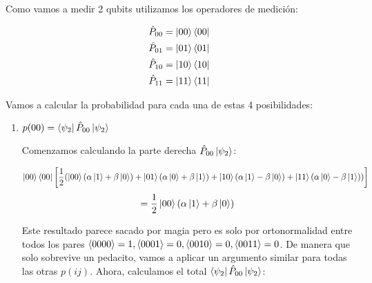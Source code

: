 \begin{itemize}
        Como vamos a medir 2 qubits utilizamos los operadores de medición:

        \begin{align*}
            \hat{P}_{00} = \ket{00}\bra{00} \\
            \hat{P}_{01} = \ket{01}\bra{01} \\
            \hat{P}_{10} = \ket{10}\bra{10} \\
            \hat{P}_{11} = \ket{11}\bra{11} \\
        \end{align*}

        Vamos a calcular la probabilidad para cada una de estas 4 posibilidades: \vspace{.3cm}
        
        \begin{enumerate}[label=\arabic*.]
            \item $p(00) = \bra{\psi_2} \hat{P}_{00} \ket{\psi_2}$ \vspace{.3cm}

            Comenzamos calculando la parte derecha $\hat{P}_{00} \ket{\psi_2}$:

                \begin{align*}
                    \ket{00}\bra{00}\left[\frac{1}{2}(\ket{00}(\alpha\ket{1}+\beta\ket{0})+\ket{01}(\alpha\ket{0}+\beta\ket{1})+\ket{10}(\alpha\ket{1}-\beta\ket{0})+\ket{11}(\alpha\ket{0}-\beta\ket{1}))\right]
                \end{align*}
                \begin{align*}
                    = \frac{1}{2} \ket{00}(\alpha \ket{1}+\beta\ket{0})
                \end{align*}
        

            Este resultado parece sacado por magia pero es solo por ortonormalidad entre todos los
            pares $\braket{0000}=1, \braket{0001}=0, \braket{0010}=0, \braket{0011}=0$. De manera
            que solo sobrevive un pedacito, vamos a aplicar un argumento similar para todas las
            otras $p(ij)$. Ahora, calculamos el total $\bra{\psi_2} \hat{P}_{00}\ket{\psi_2}$:


\end{enumerate}
\end{itemize}
